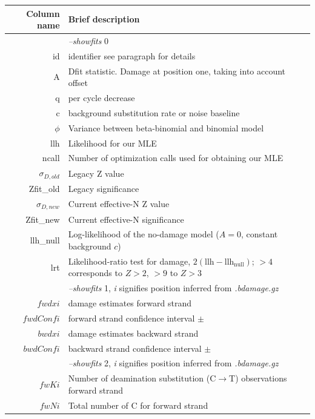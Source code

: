 \documentclass[10pt]{article}
\begin{document}
\begin{table}[h]
\begin{tabular}{rll}
  \hline
  {\bf Column name} & {\bf Brief description} \\
  \hline
  {\sf } & \textit{--showfits} 0 \\ \hline  
  {\sf id} & identifier see paragraph for details\\
  {\sf A} & Dfit statistic. Damage at position one, taking into account offset\\
  {\sf q} & per cycle decrease\\
  {\sf c} & background substitution rate or noise baseline\\ 
  {\sf $\phi$} & Variance between beta-binomial and binomial model\\
  {\sf llh} & Likelihood for our MLE\\
  {\sf ncall} & Number of optimization calls used for obtaining our MLE\\
  {\sf $\sigma_{D,old}$} & Legacy Z value\\
  {\sf Zfit\_old} & Legacy significance\\
  {\sf $\sigma_{D,new}$} & Current effective-N Z value\\
  {\sf Zfit\_new} & Current effective-N significance\\
  {\sf llh\_null} & Log-likelihood of the no-damage model ($A=0$, constant background $c$)\\
  {\sf lrt} & Likelihood-ratio test for damage, $2(\mathrm{llh}-\mathrm{llh_{null}})$; $>4$ corresponds to $Z>2$, $>9$ to $Z>3$\\\hline 
  {\sf } & \textit{--showfits} 1, \textit{i} signifies position inferred from \textit{.bdamage.gz}\\ \hline  
  {\sf $fwdxi$} & damage estimates forward strand \\
  {\sf $fwdConfi$} & forward strand confidence interval $\pm$\\
  {\sf $bwdxi$} & damage estimates backward strand\\
  {\sf $bwdConfi$} & backward strand confidence interval $\pm$\\ \hline
  {\sf } & \textit{--showfits} 2, \textit{i} signifies position inferred from \textit{.bdamage.gz} \\ \hline  
  {\sf $fwKi$} & Number of deamination substitution (C$\rightarrow$T) observations forward strand \\
  {\sf $fwNi$} & Total number of  C for forward strand\\

\end{tabular}
\end{table}
\end{document}
